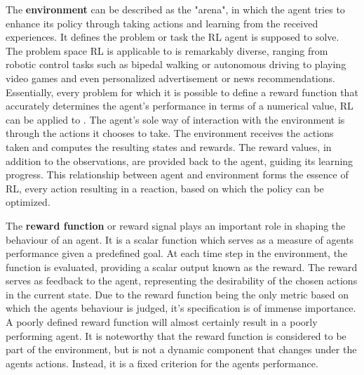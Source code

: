 
The \textbf{environment}  can be described as the "arena", in which the agent tries to enhance its policy through taking actions and learning from the received experiences.
It defines the problem or task the RL agent is supposed to solve.
The problem space RL is applicable to is remarkably diverse, ranging from robotic control tasks such as bipedal walking or autonomous driving to playing video games and even personalized advertisement or news recommendations.
Essentially, every problem for which it is possible to define a reward function that accurately determines the agent's performance in terms of a numerical value, RL can be applied to \parencite{silver2015}.
The agent's sole way of interaction with the environment is through the actions it chooses to take.
The environment receives the actions taken and computes the resulting states and rewards.
The reward values, in addition to the observations, are provided back to the agent, guiding its learning progress.
This relationship between agent and environment forms the essence of RL, every action resulting in a reaction, based on which the policy can be optimized.


\begin{comment}
Using the RL toolbox, 2 distinct types of environment are provided which differ in the definition of their action space.
If an environment has a discrete action space, it means that there exists countable, discrete actions which can be taken.
Discrete action spaces are used when the number of possible actions is limited and known in advance.
An example of such an environment would be a game of chess; for each turn there is a finite number of available moves.
Continuous action spaces on the other hand have a continuum of actions which can be taken and are used when the number of possible actions is infinite, such as the movement possibilities of a robotic arm.	
\end{comment}

The \textbf{reward function} or reward signal plays an important role in shaping the behaviour of an agent.
It is a scalar function which serves as a measure of agents performance given a predefined goal.
At each time step in the environment, the function is evaluated, providing a scalar output known as the reward.
The reward serves as feedback to the agent, representing the desirability of the chosen actions in the current state.
Due to the reward function being the only metric based on which the agents behaviour is judged, it's specification is of immense importance.
A poorly defined reward function will almost certainly result in a poorly performing agent.
It is noteworthy that the reward function is considered to be part of the environment, but is not a dynamic component that changes under the agents actions.
Instead, it is a fixed criterion for the agents performance.
\parencite{sutton2018reinforcement}

